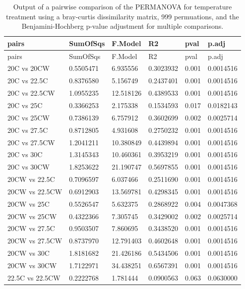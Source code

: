 \documentclass[
]{article}
\begin{document}
\begin{longtable}[]{@{}llllll@{}}
\caption{Output of a pairwise comparison of the PERMANOVA for
temperature treatment using a bray-curtis dissimilarity matrix, 999
permuations, and the Benjamini-Hochberg p-value adjustment for multiple
comparisons.}\tabularnewline
\toprule\noalign{}
pairs & SumOfSqs & F.Model & R2 & pval & p.adj \\
\midrule\noalign{}
\endfirsthead
\toprule\noalign{}
pairs & SumOfSqs & F.Model & R2 & pval & p.adj \\
\midrule\noalign{}
\endhead
\bottomrule\noalign{}
\endlastfoot
20C vs 20CW & 0.5505471 & 6.935556 & 0.3023932 & 0.001 & 0.0014516 \\
20C vs 22.5C & 0.8376580 & 5.156749 & 0.2437401 & 0.001 & 0.0014516 \\
20C vs 22.5CW & 1.0955235 & 12.518126 & 0.4389533 & 0.001 & 0.0014516 \\
20C vs 25C & 0.3366253 & 2.175338 & 0.1534593 & 0.017 & 0.0182143 \\
20C vs 25CW & 0.7386139 & 6.757912 & 0.3602699 & 0.002 & 0.0025714 \\
20C vs 27.5C & 0.8712805 & 4.931608 & 0.2750232 & 0.001 & 0.0014516 \\
20C vs 27.5CW & 1.2041211 & 10.380849 & 0.4439894 & 0.001 & 0.0014516 \\
20C vs 30C & 1.3145343 & 10.460361 & 0.3953219 & 0.001 & 0.0014516 \\
20C vs 30CW & 1.8253622 & 21.190747 & 0.5697855 & 0.001 & 0.0014516 \\
20CW vs 22.5C & 0.7096597 & 6.037466 & 0.2511690 & 0.001 & 0.0014516 \\
20CW vs 22.5CW & 0.6912903 & 13.569781 & 0.4298345 & 0.001 &
0.0014516 \\
20CW vs 25C & 0.5526547 & 5.632375 & 0.2868922 & 0.004 & 0.0047368 \\
20CW vs 25CW & 0.4322366 & 7.305745 & 0.3429002 & 0.002 & 0.0025714 \\
20CW vs 27.5C & 0.9503507 & 7.860695 & 0.3438520 & 0.001 & 0.0014516 \\
20CW vs 27.5CW & 0.8737970 & 12.791403 & 0.4602648 & 0.001 &
0.0014516 \\
20CW vs 30C & 1.8181682 & 21.426186 & 0.5434506 & 0.001 & 0.0014516 \\
20CW vs 30CW & 1.7122971 & 34.438251 & 0.6567391 & 0.001 & 0.0014516 \\
22.5C vs 22.5CW & 0.2222768 & 1.781444 & 0.0900563 & 0.063 &
0.0630000 \\

\end{longtable}
\end{document}
